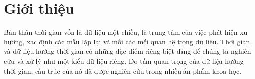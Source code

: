 \section{Giới thiệu}
Bản thân thời gian vốn là dữ liệu một chiều, là trung tâm của việc phát hiện xu hướng, xác định các mẫu lặp lại và mối các mối quan hệ trong dữ liệu. Thời gian và dữ liệu hướng thời gian có những đặc điểm riêng biệt đáng để chúng ta nghiên cứu và xử lý như một kiểu dữ liệu riêng. Do tầm quan trọng của dữ liệu hướng thời gian, cấu trúc của nó đã được nghiên cứu trong nhiều ấn phẩm khoa học.